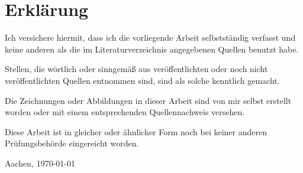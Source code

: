 \clearpage
\chapter*{Erklärung}\label{erklaerung}
Ich versichere hiermit, dass ich die vorliegende Arbeit selbstständig verfasst und keine anderen als die im Literaturverzeichnis angegebenen Quellen benutzt habe.

\bigskip

Stellen, die wörtlich oder sinngemäß aus veröffentlichten oder noch nicht veröffentlichten Quellen entnommen sind, sind als solche kenntlich gemacht.

\bigskip

Die Zeichnungen oder Abbildungen in dieser Arbeit sind von mir selbst erstellt worden oder mit einem entsprechenden Quellennachweis versehen.

\bigskip

Diese Arbeit ist in gleicher oder ähnlicher Form noch bei keiner anderen Prüfungsbehörde eingereicht worden.

\vspace{1cm}
Aachen, \today %

\vspace{7cm}




